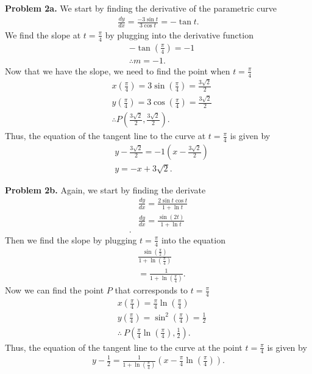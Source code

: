 \documentclass{report}
\begin{document}
    \bigbreak \noindent 
    \textbf{Problem 2a.} We start by finding the derivative of the parametric curve
    \begin{align*}
        \frac{dy}{dx} = \frac{-3\sin{t}}{3\cos{t}} = -\tan{t}
    .\end{align*}
    We find the slope at $t=\frac{\pi}{4}$ by plugging into the derivative function 
    \begin{align*}
        &-\tan{\left(\frac{\pi}{4}\right)} = -1 \\
        &\therefore m = -1
    .\end{align*}
    Now that we have the slope, we need to find the point when $t=\frac{\pi}{4}$
    \begin{align*}
        &x\left(\frac{\pi}{4}\right) = 3\sin{\left(\frac{\pi}{4}\right)} = \frac{3\sqrt{2}}{2} \\
        &y\left(\frac{\pi}{4}\right) = 3\cos{\left(\frac{\pi}{4}\right)} = \frac{3\sqrt{2}}{2} \\
        &\therefore P\left(\frac{3\sqrt{2}}{2}, \frac{3\sqrt{2}}{2}\right)
    .\end{align*}
    Thus, the equation of the tangent line to the curve at $t=\frac{\pi}{4} $ is given by 
    \begin{align*}
        &y - \frac{3\sqrt{2}}{2} = -1\left(x-\frac{3\sqrt{2}}{2}\right) \\
        &y=-x+3\sqrt{2}
    .\end{align*}

    \pagebreak \bigbreak \noindent 
    \textbf{Problem 2b.} Again, we start by finding the derivate
    \begin{align*}
        &\frac{dy}{dx} = \frac{2\sin{t}\cos{t}}{1+\ln{t}} \\
        &\frac{dy}{dx} = \frac{\sin{(2t)}}{1+\ln{t}} \\
    .\end{align*}
    Then we find the slope by plugging $t=\frac{\pi}{4}$ into the equation
    \begin{align*}
        &\frac{\sin{\left(\frac{\pi}{2}\right)}}{1+\ln{\left(\frac{\pi}{4}\right)}} \\
        &=\frac{1}{1+\ln{\left(\frac{\pi}{4}\right)}}
    .\end{align*}
    Now we can find the point $P$ that corresponds to $t=\frac{\pi}{4} $
    \begin{align*}
        &x\left(\frac{\pi}{4}\right) = \frac{\pi}{4}\ln{\left(\frac{\pi}{4}\right)} \\
        &y\left(\frac{\pi}{4}\right) = \sin^{2}{\left(\frac{\pi}{4}\right)} = \frac{1}{2} \\
        &\therefore\ P\left(\frac{\pi}{4}\ln{\left(\frac{\pi}{4}\right)},\frac{1}{2}\right)
    .\end{align*}
    Thus, the equation of the tangent line to the curve at the point $t=\frac{\pi}{4} $ is given by
    \begin{align*}
        y - \frac{1}{2} = \frac{1}{1+\ln{\left(\frac{\pi}{4}\right)}}\left(x-\frac{\pi}{4}\ln{\left(\frac{\pi}{4}\right)}\right)
    .\end{align*}
\end{document}
